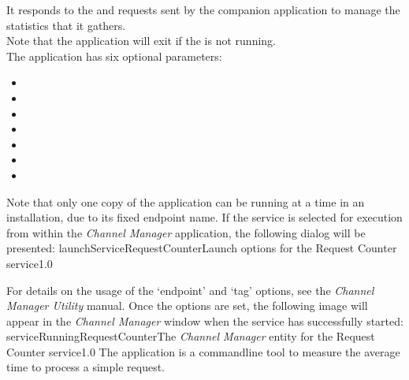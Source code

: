 It responds to the  and
 requests sent by the
companion application  to manage the statistics
that it gathers.\\

Note that the application will exit if the
 is not running.\\

The application has six optional parameters:
\begin{itemize}
\item{}
\item\exSp{}
\item\exSp{}
\item\exSp{}
\item\exSp{}
\item\exSp{}
\item\exSp{}
\end{itemize}
Note that only one copy of the  application can be
running at a time in an \mplusm{} installation, due to its fixed endpoint name.
\condPage
If the service is selected for execution from within the \emph{Channel Manager}
application, the following dialog will be presented:
%
{launchServiceRequestCounter}{Launch options for the Request Counter service}{1.0}

For details on the usage of the `endpoint' and `tag' options, see the \emph{Channel
Manager Utility} manual.
Once the options are set, the following image will appear in the \emph{Channel Manager}
window when the service has successfully started:
%
{serviceRunningRequestCounter}{The \emph{Channel Manager} entity for the Request Counter
service}{1.0}
\condPage
{}
The  application is a command\longDash{}line tool to
measure the average time to process a simple request.\\

